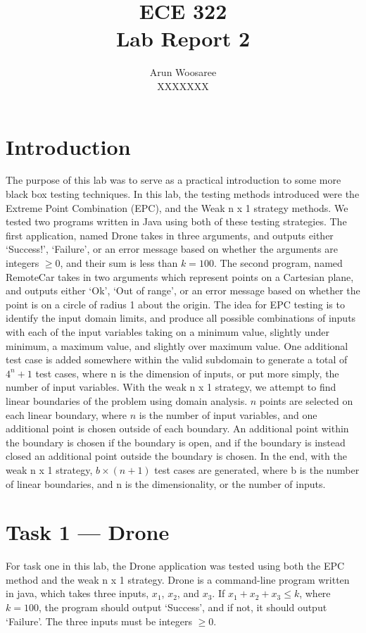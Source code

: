 \documentclass[letterpaper]{article}
\title{ECE 322 \\
Lab Report 2}
\author{Arun Woosaree\\
XXXXXXX}
\begin{document}
\maketitle
\section{Introduction} The purpose of this lab was to serve as a practical
introduction to some more black box testing techniques. In this lab, the
testing methods introduced were the Extreme Point Combination (EPC), and the
Weak n x 1 strategy methods. We tested two programs written in Java using both
of these testing strategies. The first application, named Drone takes in three
arguments, and outputs either `Success!', `Failure', or an error message based
on whether the arguments are integers $\geq 0$, and their sum is less than
$k=100$. The second program, named RemoteCar takes in two arguments which
represent points on a Cartesian plane, and outputs either `Ok', `Out of range',
or an error message based on whether the point is on a circle of radius 1 about
the origin. The idea for EPC testing is to identify the input domain limits,
and produce all possible combinations of inputs with each of the input
variables taking on a minimum value, slightly under minimum, a maximum value,
and slightly over maximum value. One additional test case is added somewhere
within the valid subdomain to generate a total of $4^n + 1$ test cases, where
n is the dimension of inputs, or put more simply, the number of input
variables. With the weak n x 1 strategy, we attempt to find linear boundaries 
of the problem using domain analysis. $n$ points are selected on each linear
boundary, where $n$ is the number of input variables, and one additional point 
is chosen outside of each boundary. An additional point within the boundary is
chosen if the boundary is open, and if the boundary is instead closed an 
additional point outside the boundary is chosen. In the end, with the weak
n x 1 strategy, $b \times (n + 1)$ test cases are generated, where b is the 
number of linear boundaries, and n is the dimensionality, or the number of
inputs.

\section{Task 1 — Drone}
For task one in this lab, the Drone application was tested using both the
EPC method and the weak n x 1 strategy. Drone is a command-line program
written in java, which takes three inputs, $x_1$, $x_2$, and $x_3$.
If $x_1 + x_2 + x_3 \leq k$, where $k=100$, the program should output
`Success', and if not, it should output `Failure'. The three inputs 
must be integers $\geq 0$. 
\end{document}
